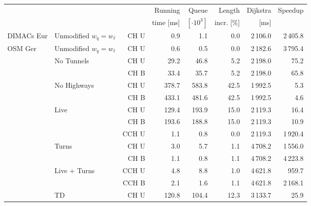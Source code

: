 \begin{tabular}{llrrrrrr}
\toprule & & &   Running &                Queue &     Length & Dijkstra & Speedup \\ & & & time [ms] & $[\cdot 10^3]$ & incr. [\%] &     [ms] &         \\
\midrule
DIMACs Eur & Unmodified $w_q = w_{\ell}$ & CH U &              0.9 &              1.1 &       0.0 &                    2\,106.0 &   2\,405.8 \\ \addlinespace
OSM Ger & Unmodified $w_q = w_{\ell}$ & CH U &              0.6 &              0.5 &       0.0 &                    2\,182.6 &   3\,795.4 \\[2pt]
        & No Tunnels & CH U &             29.2 &             46.8 &       5.2 &                    2\,198.0 &     75.2 \\
        &    & CH B &             33.4 &             35.7 &       5.2 &                    2\,198.0 &     65.8 \\[2pt]
        & No Highways & CH U &            378.7 &            583.8 &      42.5 &                    1\,992.5 &      5.3 \\
        &    & CH B &            433.1 &            481.6 &      42.5 &                    1\,992.5 &      4.6 \\[2pt]
        & Live & CH U &            129.4 &            193.9 &      15.0 &                    2\,119.3 &     16.4 \\
        &    & CH B &            193.6 &            188.8 &      15.0 &                    2\,119.3 &     10.9 \\
        &    & CCH U &              1.1 &              0.8 &       0.0 &                    2\,119.3 &   1\,920.4 \\[2pt]
        & Turns & CH U &              3.0 &              5.7 &       1.1 &                    4\,708.2 &   1\,556.0 \\
        &    & CH B &              1.1 &              0.8 &       1.1 &                    4\,708.2 &   4\,223.8 \\[2pt]
        & Live + Turns & CCH U &              4.8 &              8.8 &       1.0 &                    4\,621.8 &    959.7 \\
        &    & CCH B &              2.1 &              1.6 &       1.1 &                    4\,621.8 &   2\,168.1 \\[2pt]
        & TD & CH U &            120.8 &            104.4 &      12.3 &                    3\,133.7 &     25.9 \\

\end{tabular}
